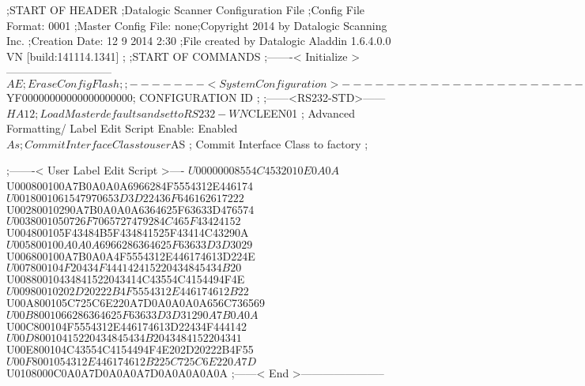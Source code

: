 ;START OF HEADER
;Datalogic Scanner Configuration File
;Config File Format: 0001
;Master Config File: none;Copyright 2014 by Datalogic Scanning Inc.
;Creation Date: 12 9 2014 2:30
;File created by Datalogic Aladdin 1.6.4.0.0 VN [build:141114.1341]
;
;START OF COMMANDS
;-------< Initialize >-----------------------------
$AE                 ; Erase Config Flash
;
;-------< System Configuration >-------------------------------
$YF00000000000000000000; CONFIGURATION ID
;
;------<RS232-STD>------
$HA12               ; Load Master defaults and set to RS232-WN
$CLEEN01            ; Advanced Formatting/ Label Edit Script Enable: Enabled
$As                 ; Commit Interface Class to user
$AS                 ; Commit Interface Class to factory
;

;-------< User Label Edit Script >----
$U00000008554C4532010E0A0A
$U000800100A7B0A0A0A6966284F5554312E446174
$U0018001061547970653D3D22436F646162617222
$U00280010290A7B0A0A0A6364625F63633D476574
$U0038001050726F7065727479284C465F43424152
$U004800105F43484B5F434841525F43414C43290A
$U005800100A0A0A6966286364625F63633D3D3029
$U006800100A7B0A0A4F5554312E446174613D224E
$U007800104F20434F444142415220434845434B20
$U00880010434841522043414C43554C4154494F4E
$U00980010202D20222B4F5554312E446174612B22
$U00A800105C725C6E220A7D0A0A0A0A656C736569
$U00B8001066286364625F63633D3D31290A7B0A0A
$U00C800104F5554312E446174613D22434F444142
$U00D80010415220434845434B2043484152204341
$U00E800104C43554C4154494F4E202D20222B4F55
$U00F8001054312E446174612B225C725C6E220A7D
$U0108000C0A0A7D0A0A0A7D0A0A0A0A0A
;------< End >-----------------------
